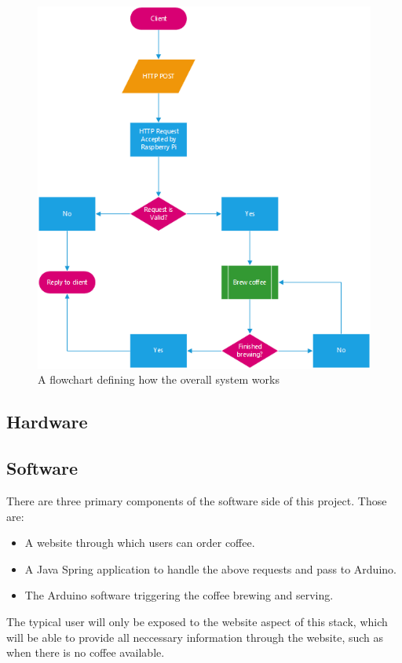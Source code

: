 \documentclass[12pt, a4paper]{article}
\begin{document}
\begin{figure}[H]
    \centering    
    \includegraphics[scale=0.95]{images/flowchart}
    \caption{A flowchart defining how the overall system works}
\end{figure}

\newpage


\subsection{Hardware}

\newpage


\subsection{Software}
There are three primary components of the software side of this project. Those
are:
\begin{itemize}
	\item A website through which users can order coffee.
	\item A Java Spring application to handle the above requests and pass to
	Arduino.
	\item The Arduino software triggering the coffee brewing and serving.
\end{itemize}
The typical user will only be exposed to the website aspect of this stack, which
will be able to provide all neccessary information through the website, such as
when there is no coffee available.
\end{document}
